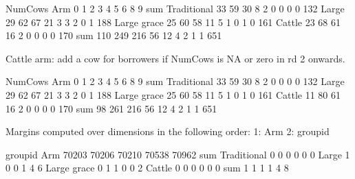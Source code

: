 \begin{Schunk}
\begin{Soutput}
             NumCows
Arm             0   1   2   3   4   5   6   8   9 sum
  Traditional  33  59  30   8   2   0   0   0   0 132
  Large        29  62  67  21   3   3   2   0   1 188
  Large grace  25  60  58  11   5   1   0   1   0 161
  Cattle       23  68  61  16   2   0   0   0   0 170
  sum         110 249 216  56  12   4   2   1   1 651
\end{Soutput}
\end{Schunk}
Cattle arm: add a cow for borrowers if NumCows is NA or zero in rd 2 onwards.
\begin{Schunk}
\begin{Soutput}
             NumCows
Arm             0   1   2   3   4   5   6   8   9 sum
  Traditional  33  59  30   8   2   0   0   0   0 132
  Large        29  62  67  21   3   3   2   0   1 188
  Large grace  25  60  58  11   5   1   0   1   0 161
  Cattle       11  80  61  16   2   0   0   0   0 170
  sum          98 261 216  56  12   4   2   1   1 651
\end{Soutput}
\begin{Soutput}
Margins computed over dimensions
in the following order:
1: Arm
2: groupid
\end{Soutput}
\begin{Soutput}
             groupid
Arm           70203 70206 70210 70538 70962 sum
  Traditional     0     0     0     0     0   0
  Large           1     0     0     1     4   6
  Large grace     0     1     1     0     0   2
  Cattle          0     0     0     0     0   0
  sum             1     1     1     1     4   8
\end{Soutput}
\end{Schunk}



